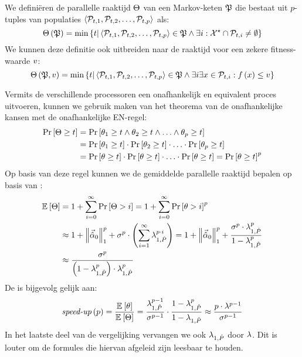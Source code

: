 \begin{definition}
We defini\"eren de parallelle raaktijd $\phittime$ van een Markov-keten $\PopChain$ die bestaat uit $p$-tuples van populaties $\tupl{\PopSet_{t,1},\PopSet_{t,2},\ldots,\PopSet_{t,p}}$ als:
\begin{equation}
\fun{\phittime}{\PopChain}=\min\accl{t|\tupl{\PopSet_{t,1},\PopSet_{t,2},\ldots,\PopSet_{t,p}}\in\PopChain\wedge\exists i:\ConfigOpSet\cap \PopSet_{t,i}\neq\emptyset}
\end{equation}
We kunnen deze definitie ook uitbreiden naar de raaktijd voor een zekere fitness-waarde $\fitnessval$:
\begin{equation}
\fun{\phittime}{\PopChain,\fitnessval}=\min\accl{t|\tupl{\PopSet_{t,1},\PopSet_{t,2},\ldots,\PopSet_{t,p}}\in\PopChain\wedge\exists i\exists \sol\in\PopSet_{t,i}:\fun{\evalfun}{\sol}\leq \fitnessval}
\end{equation}
\end{definition}
Vermits de verschillende processoren een onafhankelijk en equivalent proces uitvoeren, kunnen we gebruik maken van het theorema van de onafhankelijke kansen met de onafhankelijke EN-regel:
\begin{equation}
\begin{aligned}
\Prob{\phittime\geq t}&=\Prob{\hittime_1\geq t\wedge\hittime_2\geq t\wedge\ldots\wedge\hittime_p\geq t}\\
&=\Prob{\hittime_1\geq t}\cdot\Prob{\hittime_2\geq t}\cdot\ldots\cdot\Prob{\hittime_p\geq t}\\
&=\Prob{\hittime\geq t}\cdot\Prob{\hittime\geq t}\cdot\ldots\cdot\Prob{\hittime\geq t}=\Prob{\hittime\geq t}^p
\end{aligned}
\eqnlab{probabilityPower}
\end{equation}
Op basis van deze regel kunnen we de gemiddelde parallelle raaktijd bepalen op basis van :
\begin{equation}
\begin{aligned}
\mean{\phittime}&=1+\displaystyle\sum_{i=0}^{\infty}{\Prob{\phittime>i}}=1+\displaystyle\sum_{i=0}^{\infty}{\Prob{\hittime>i}^p}\\
&\approx 1+\dabs[1]{\probdistnormmeta{0}}^p+\metapa^p\cdot\brak{\displaystyle\sum_{i=1}^{\infty}\ev[1,\removmat]^{p\cdot i}}=1+\dabs[1]{\probdistnormmeta{0}}^p+\displaystyle\frac{\metapa^p\cdot\ev[1,\removmat]^p}{1-\ev[1,\removmat]^p}\\
&\approx\displaystyle\frac{\metapa^p}{\brak{1-\ev[1,\removmat]^p}\cdot\ev[1,\removmat]^{p}}
\end{aligned}
\eqnlab{probabilityPower}
\end{equation}
De \absu{} is bijgevolg gelijk aan:
\begin{equation}
\funm{\absu{}}{p}=\displaystyle\frac{\mean{\hittime}}{\mean{\phittime}}=\displaystyle\frac{\ev[1,\removmat]^{p-1}}{\metapa^{p-1}}\cdot\displaystyle\frac{1-\ev[1,\removmat]^{p}}{1-\ev[1,\removmat]}\approx\displaystyle\frac{p\cdot\metapb^{p-1}}{\metapa^{p-1}}
\eqnlab{speedupMetaheuristic}
\end{equation}
In het laatste deel van de vergelijking vervangen we ook $\ev[1,\removmat]$ door $\metapb$. Dit is louter om de formules die hiervan afgeleid zijn leesbaar te houden.

